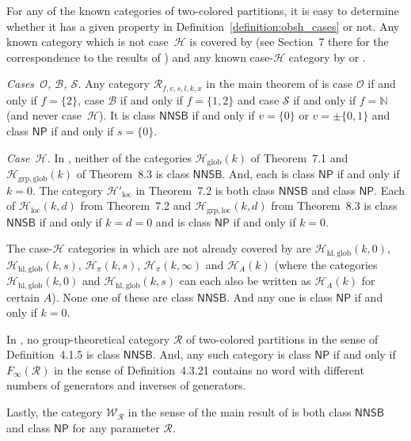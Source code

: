 \documentclass[10pt,a4paper]{amsart}
\numberwithin{equation}{section}
\newcommand{\pint}{\mathbb{N}}
\newcommand{\onlyneutralnonsingletonblocks}{\mathsf{NNSB}}
\newcommand{\onlyneutralpartitions}{\mathsf{NP}}
\begin{document}
\begin{Remark}
  \label{remark:two-colored-categories}
  \newcommand{\anycat}{\mathcal{R}}
  For any of the known categories of two-colored partitions, it is easy to determine whether it has a given property in Definition~\ref{definition:obsh_cases} or not. Any known category which is not case~$\mathcal{H}$ is covered by \cite{MangWeber2021b} (see Section~7 there for the correspondence to the results of \cite{Gromada2018, MangWeber2020, MangWeber2021a, TarragoWeber2018}) and any known case-$\mathcal{H}$ category by \cite{Gromada2018,Maassen2021,TarragoWeber2018} or \cite[Chapter~1]{Mang2022}.

\emph{Cases~$\mathcal{O}$, $\mathcal{B}$, $\mathcal{S}$.} Any category $\mathcal{R}_{f,v,s,l,k,x}$ in the main theorem of \cite{MangWeber2021b} is case $\mathcal{O}$ if and only if $f=\{2\}$, case $\mathcal{B}$ if and only if $f=\{1,2\}$ and case $\mathcal{S}$ if and only if $f=\pint$ (and never case~$\mathcal{H}$). It is class $\onlyneutralnonsingletonblocks$ if and only if $v=\{0\}$ or $v=\pm\{0,1\}$ and class $\onlyneutralpartitions$ if and only if $s=\{0\}$.

\emph{Case~$\mathcal{H}$.} In \cite{TarragoWeber2018}, neither of the categories $\mathcal{H}_{\mathrm{glob}}(k)$ of Theorem~7.1 and $\mathcal{H}_{\mathrm{grp},\mathrm{glob}}(k)$ of Theorem~8.3 is class $\onlyneutralnonsingletonblocks$. And, each is class $\onlyneutralpartitions$ if and only if $k=0$. The category  $\mathcal{H}'{}_{\mathrm{loc}}$ in  Theorem~7.2 is both class $\onlyneutralnonsingletonblocks$ and class $\onlyneutralpartitions$. Each of $\mathcal{H}_{\mathrm{loc}}(k,d)$ from Theorem~7.2 and $\mathcal{H}_{\mathrm{grp},\mathrm{loc}}(k,d)$ from Theorem~8.3 is class $\onlyneutralnonsingletonblocks$  if and only if $k=d=0$ and is class $\onlyneutralpartitions$ if and only if $k=0$.

The  case-$\mathcal{H}$ categories in \cite[Table~1]{Gromada2018} which are not already covered by  \cite{TarragoWeber2018} are
$\mathcal{H}_{\mathrm{hl},\mathrm{glob}}(k,0)$,  $\mathcal{H}_{\mathrm{hl},\mathrm{glob}}(k,s)$,  $\mathcal{H}_{\pi}(k,s)$,  $\mathcal{H}_{\pi}(k,\infty)$ and $\mathcal{H}_{A}(k)$ (where the categories $\mathcal{H}_{\mathrm{hl},\mathrm{glob}}(k,0)$ and  $\mathcal{H}_{\mathrm{hl},\mathrm{glob}}(k,s)$ can each also be written as $\mathcal{H}_{A}(k)$ for certain $A$). None one of these are class $\onlyneutralnonsingletonblocks$. And any one is class $\onlyneutralpartitions$ if and only if $k= 0$.

In \cite{Maassen2021}, no group-theoretical category $\anycat$ of two-colored partitions in the sense of Definition~4.1.5 is class $\onlyneutralnonsingletonblocks$. And, any such category is class $\onlyneutralpartitions$ if and only if $F_\infty(\anycat)$ in the sense of Definition~4.3.21 contains no word with different numbers of generators and inverses of generators.

Lastly, the category $\mathcal{W}_{\mathcal{R}}$ in the sense of the main result of \cite[Chapter~1]{Mang2022} is both class $\onlyneutralnonsingletonblocks$ and class $\onlyneutralpartitions$ for any parameter $\mathcal{R}$.
\end{Remark}
\end{document}
